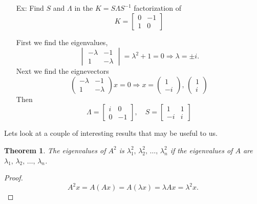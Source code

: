 \documentclass[reqno]{amsart}
\newtheorem{thm}{Theorem}
\theoremstyle{definition}
\begin{document}
\begin{enumerate}
\item[Ex:  ]  Find $S$ and $\Lambda$ in the $K = S\Lambda S^{-1}$ factorization of
%
\begin{equation*}
K = \begin{bmatrix}
0 & -1\\
1 & 0
\end{bmatrix}
\end{equation*}

First we find the eigenvalues,
%
\begin{equation*}
\begin{vmatrix}
-\lambda & -1\\
1 & -\lambda
\end{vmatrix} = \lambda^2 + 1 = 0 \Rightarrow \lambda = \pm i.
\end{equation*}
%
Next we find the eignevectors
%
\begin{equation*}
\begin{pmatrix}
-\lambda & -1\\
1 & -\lambda
\end{pmatrix}x = 0 \Rightarrow x = \begin{pmatrix}
1\\
-i
\end{pmatrix},\, \begin{pmatrix}
1\\
i
\end{pmatrix}
\end{equation*}
%
Then
%
\begin{equation*}
\Lambda = \begin{bmatrix}
i & 0\\
0 & -1
\end{bmatrix},\quad S = \begin{bmatrix}
1 & 1\\
-i & i
\end{bmatrix}
\end{equation*}

\end{enumerate}

Lets look at a couple of interesting results that may be useful to us.

\begin{thm}
The eigenvalues of $A^2$ is $\lambda_1^2,\,\lambda_2^2,\,\ldots,\,\lambda_n^2$ if the eigenvalues of $A$ are $\lambda_1,\,\lambda_2,\,\ldots,\,\lambda_n$.
\end{thm}

\begin{proof}
\begin{equation*}
A^2x = A(Ax) = A(\lambda x) = \lambda Ax = \lambda^2 x.
\end{equation*}
\end{proof}
\end{document}

